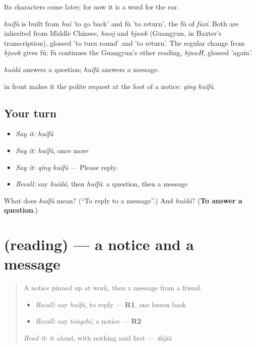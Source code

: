 Its characters come later; for now it is a word for the ear.

\begin{cousinweb}
\emph{huífù} is built from \emph{huí} 'to go back' and fù 'to return', the fù of \emph{fùxí}. Both are inherited from Middle Chinese, \emph{hwoj} and \emph{bjuwk} (Guangyun, in Baxter's transcription), glossed 'to turn round' and 'to return'. The regular change from \emph{bjuwk} gives fú; fù continues the Guangyun's other reading, \emph{bjuwH}, glossed 'again'.
\end{cousinweb}

\begin{grammarlens}[title={What you've built}]
\emph{huídá} answers a question; \emph{huífù} answers a message.

 in front makes it the polite request at the foot of a notice: \emph{qǐng huífù}.
\end{grammarlens}

\subsection*{Your turn}
\begin{itemize}
\raggedright
  \item \emph{Say it:} \emph{huífù}
  \item \emph{Say it:} \emph{huífù}, once more
  \item \emph{Say it:} \emph{qǐng huífù} — Please reply.
  \item \emph{Recall:} say \emph{huídá}, then \emph{huífù}: a question, then a message
\end{itemize}

\begin{tcolorbox}[breakable,colback=teal!4,colframe=teal!35!black,title={Before you move on}]
What does \emph{huífù} mean? (\textquotedblleft{}To reply to a message\textquotedblright{}.) And \emph{huídá}? (\textbf{To answer a question}.)
\end{tcolorbox}
\section[(reading)]{(reading) — a notice and a message}

\label{lesson:ZH-C157-reading}



\begin{quote}
A notice pinned up at work, then a message from a friend.

\begin{itemize}
\raggedright
  \item \emph{Recall:} say \emph{huífù}, to reply — \textbf{R1}, one lesson back
  \item \emph{Recall:} say \emph{tōngzhī}, a notice — \textbf{R2}
\end{itemize}

\begin{quote}
\end{quote}

\emph{Read it:} it aloud, with nothing said first — \emph{dàjiā}
\end{quote}

